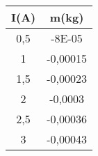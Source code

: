 \begin{tabular}{|c|c|}
\hline
I(A)	&m(kg)	\\ \hline
0,5	&-8E-05	\\
1	&-0,00015\\
1,5	&-0,00023\\
2	&-0,0003 \\
2,5	&-0,00036\\
3	&-0,00043\\ \hline
\end{tabular}
